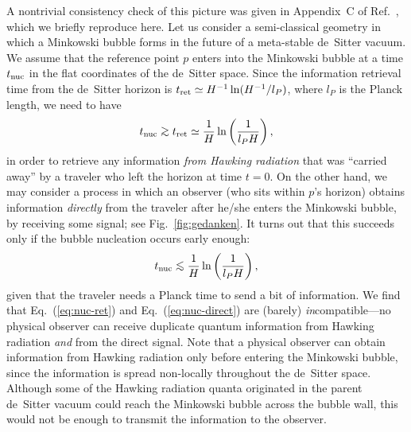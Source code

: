 \documentclass[12pt]{article}
\begin{document}
A nontrivial consistency check of this picture was given in Appendix~C 
of Ref.~\cite{Nomura:2011dt}, which we briefly reproduce here.  Let us 
consider a semi-classical geometry in which a Minkowski bubble forms in 
the future of a meta-stable de~Sitter vacuum.  We assume that the reference 
point $p$ enters into the Minkowski bubble at a time $t_{\rm nuc}$ in 
the flat coordinates of the de~Sitter space.  Since the information 
retrieval time from the de~Sitter horizon is $t_{\rm ret} \simeq H^{-1} 
\ln(H^{-1}/l_P)$, where $l_P$ is the Planck length, we need to have
%
\begin{equation}
  t_{\rm nuc} \simgt t_{\rm ret} 
  \simeq \frac{1}{H} \ln\left(\frac{1}{l_P H}\right),
\label{eq:nuc-ret}
\end{equation}
%
in order to retrieve any information {\it from Hawking radiation} that 
was ``carried away'' by a traveler who left the horizon at time $t = 0$. 
On the other hand, we may consider a process in which an observer (who 
sits within $p$'s horizon) obtains information {\it directly} from the 
traveler after he/she enters the Minkowski bubble, by receiving some 
signal; see Fig.~\ref{fig:gedanken}.  It turns out that this succeeds 
only if the bubble nucleation occurs early enough:
%
\begin{equation}
  t_{\rm nuc} \simlt \frac{1}{H} \ln\left(\frac{1}{l_P H}\right),
\label{eq:nuc-direct}
\end{equation}
%
given that the traveler needs a Planck time to send a bit of information. 
We find that Eq.~(\ref{eq:nuc-ret}) and Eq.~(\ref{eq:nuc-direct}) are 
(barely) {\it in}compatible---no physical observer can receive duplicate 
quantum information from Hawking radiation {\it and} from the direct signal. 
Note that a physical observer can obtain information from Hawking radiation 
only before entering the Minkowski bubble, since the information is spread 
non-locally throughout the de~Sitter space.  Although some of the 
Hawking radiation quanta originated in the parent de~Sitter vacuum 
could reach the Minkowski bubble across the bubble wall, this would 
not be enough to transmit the information to the observer.
%
\end{document}
